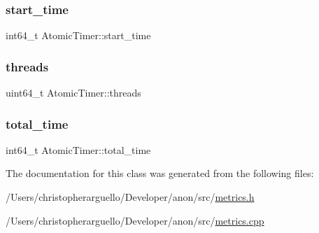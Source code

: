\subsubsection{\texorpdfstring{start\+\_\+time}{start\_time}}
{\footnotesize\ttfamily int64\+\_\+t Atomic\+Timer\+::start\+\_\+time\hspace{0.3cm}{\ttfamily [private]}}

\mbox{\label{class_atomic_timer_a44ad04b8f5504a6130650c259e52d34e}} 
\subsubsection{\texorpdfstring{threads}{threads}}
{\footnotesize\ttfamily uint64\+\_\+t Atomic\+Timer\+::threads\hspace{0.3cm}{\ttfamily [private]}}

\mbox{\label{class_atomic_timer_a1edae2559b03358ec2fe156f6042f9bd}} 
\subsubsection{\texorpdfstring{total\+\_\+time}{total\_time}}
{\footnotesize\ttfamily int64\+\_\+t Atomic\+Timer\+::total\+\_\+time\hspace{0.3cm}{\ttfamily [private]}}



The documentation for this class was generated from the following files\+:\begin{DoxyCompactItemize}
\item 
/\+Users/christopherarguello/\+Developer/anon/src/\mbox{\hyperlink{metrics_8h}{metrics.\+h}}\item 
/\+Users/christopherarguello/\+Developer/anon/src/\mbox{\hyperlink{metrics_8cpp}{metrics.\+cpp}}\end{DoxyCompactItemize}
